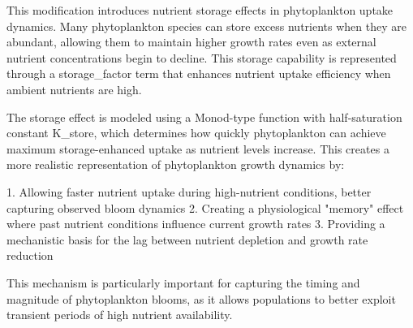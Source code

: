 This modification introduces nutrient storage effects in phytoplankton uptake dynamics. Many phytoplankton species can store excess nutrients when they are abundant, allowing them to maintain higher growth rates even as external nutrient concentrations begin to decline. This storage capability is represented through a storage_factor term that enhances nutrient uptake efficiency when ambient nutrients are high.

The storage effect is modeled using a Monod-type function with half-saturation constant K_store, which determines how quickly phytoplankton can achieve maximum storage-enhanced uptake as nutrient levels increase. This creates a more realistic representation of phytoplankton growth dynamics by:

1. Allowing faster nutrient uptake during high-nutrient conditions, better capturing observed bloom dynamics
2. Creating a physiological "memory" effect where past nutrient conditions influence current growth rates
3. Providing a mechanistic basis for the lag between nutrient depletion and growth rate reduction

This mechanism is particularly important for capturing the timing and magnitude of phytoplankton blooms, as it allows populations to better exploit transient periods of high nutrient availability.
